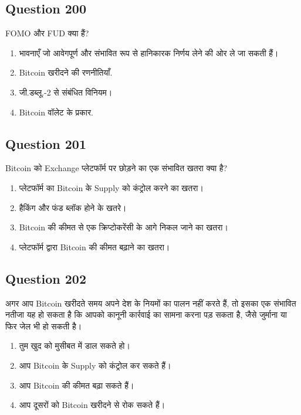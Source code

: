 \documentclass[12pt,a4paper]{article}
\begin{document}
\bigskip


\subsection*{Question 200}
FOMO और FUD क्या हैं?

\begin{enumerate}[label=\Alph*., leftmargin=*]
\item भावनाएँ जो आवेगपूर्ण और संभावित रूप से हानिकारक निर्णय लेने की ओर ले जा सकती हैं।
\item Bitcoin खरीदने की रणनीतियाँ.
\item जी.डब्लू.-2 से संबंधित विनियम।
\item Bitcoin वॉलेट के प्रकार.
\end{enumerate}

\bigskip


\subsection*{Question 201}
Bitcoin को Exchange प्लेटफॉर्म पर छोड़ने का एक संभावित खतरा क्या है?

\begin{enumerate}[label=\Alph*., leftmargin=*]
\item प्लेटफॉर्म का Bitcoin के Supply को कंट्रोल करने का खतरा।
\item हैकिंग और फंड ब्लॉक होने के खतरे।
\item Bitcoin की कीमत से एक क्रिप्टोकरेंसी के आगे निकल जाने का खतरा।
\item प्लेटफॉर्म द्वारा Bitcoin की कीमत बढ़ाने का खतरा।
\end{enumerate}

\bigskip


\subsection*{Question 202}
अगर आप Bitcoin खरीदते समय अपने देश के नियमों का पालन नहीं करते हैं, तो इसका एक संभावित नतीजा यह हो सकता है कि आपको कानूनी कार्रवाई का सामना करना पड़ सकता है, जैसे जुर्माना या फिर जेल भी हो सकती है।

\begin{enumerate}[label=\Alph*., leftmargin=*]
\item तुम खुद को मुसीबत में डाल सकते हो।
\item आप Bitcoin के Supply को कंट्रोल कर सकते हैं।
\item आप Bitcoin की कीमत बढ़ा सकते हैं।
\item आप दूसरों को Bitcoin खरीदने से रोक सकते हैं।
\end{enumerate}
\end{document}
